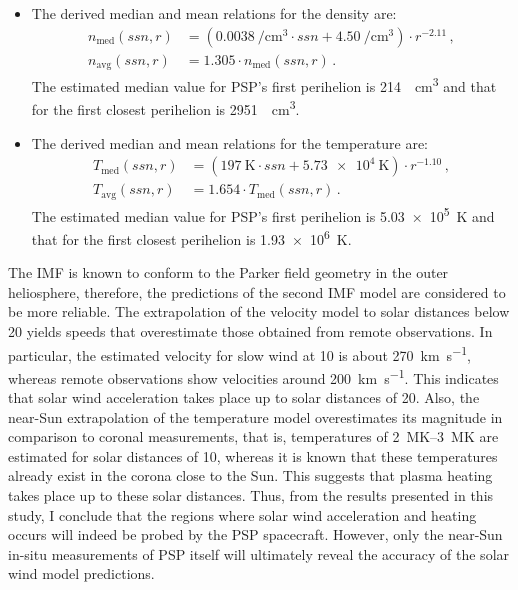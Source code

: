 \begin{itemize}
	\item The derived median and mean relations for the density are:
	\begin{align*}
		n_\text{med}(ssn,r) &= \left(\SI{0.0038}{\per\cm\cubed} \cdot ssn + \SI{4.50}{\per\cm\cubed}\right) \cdot r^{-2.11}	\,,\\
		n_\text{avg}(ssn,r) &= 1.305 \cdot n_\text{med}(ssn,r)	\,.
	\end{align*}
	 The estimated median value for PSP's first perihelion is \SI{214}{\per\cm\cubed} and that for the first closest perihelion is \SI{2951}{\per\cm\cubed}.
	
	\item The derived median and mean relations for the temperature are:
	\begin{align*}
		T_\text{med}(ssn,r) &= (\SI{197}{\K} \cdot ssn + \SI{5.73e4}{\K}) \cdot r^{-1.10}	\,,\\
		T_\text{avg}(ssn,r) &= 1.654 \cdot T_\text{med}(ssn,r)\,.
	\end{align*}
	 The estimated median value for PSP's first perihelion is \SI{5.03e5}{\kelvin} and that for the first closest perihelion is \SI{1.93e6}{\kelvin}.
\end{itemize}

\medskip

The IMF is known to conform to the Parker field geometry in the outer heliosphere, therefore, the predictions of the second IMF model are considered to be more reliable.
The extrapolation of the velocity model to solar distances below \SI{20}{\Rs} yields speeds that overestimate those obtained from remote observations. In particular, the estimated velocity for slow wind at \SI{10}{\Rs} is about \SI{270}{\km\per\s}, whereas remote observations show velocities around \SI{200}{\km\per\s}. This indicates that solar wind acceleration takes place up to solar distances of \SI{20}{\Rs}.
Also, the near-Sun extrapolation of the temperature model overestimates its magnitude in comparison to coronal measurements, that is, temperatures of \SIrange{2}{3}{\mega\kelvin} are estimated for solar distances of \SI{10}{\Rs}, whereas it is known that these temperatures already exist in the corona close to the Sun. This suggests that plasma heating takes place up to these solar distances.
Thus, from the results presented in this study, I conclude that the regions where solar wind acceleration and heating occurs will indeed be probed by the PSP spacecraft. However, only the near-Sun in-situ measurements of PSP itself will ultimately reveal the accuracy of the solar wind model predictions.

